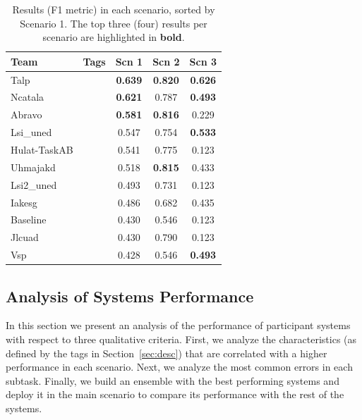 \documentclass[11pt,a4paper]{article}
\begin{document}
\begin{table}[tb]\centering
    \begin{tabular}{llccc}
        \toprule
        Team         & Tags  & Scn 1     & Scn 2     & Scn 3     \\
        \midrule
        Talp         &       & \bf 0.639 & \bf 0.820 & \bf 0.626 \\
        Ncatala      &       & \bf 0.621 &     0.787 & \bf 0.493 \\
        Abravo       &       & \bf 0.581 & \bf 0.816 &     0.229 \\
        Lsi\_uned    &       &     0.547 &     0.754 & \bf 0.533 \\
        Hulat-TaskAB &       &     0.541 &     0.775 &     0.123 \\
        Uhmajakd     &       &     0.518 & \bf 0.815 &     0.433 \\
        Lsi2\_uned   &       &     0.493 &     0.731 &     0.123 \\
        Iakesg       &       &     0.486 &     0.682 &     0.435 \\
        Baseline     &       &     0.430 &     0.546 &     0.123 \\
        Jlcuad       &       &     0.430 &     0.790 &     0.123 \\
        Vsp          &       &     0.428 &     0.546 & \bf 0.493 \\
        \bottomrule
    \end{tabular}
    \caption{Results (F1 metric) in each scenario, sorted by Scenario 1. The top three (four) results per scenario are highlighted in \textbf{bold}.}
\end{table}


\subsection{Analysis of Systems Performance}

In this section we present an analysis of the performance of participant systems with respect to three qualitative criteria. First, we analyze the characteristics (as defined by the tags in Section~\ref{sec:desc}) that are correlated with a higher performance in each scenario. Next, we analyze the most common errors in each subtask. Finally, we build an ensemble with the best performing systems and deploy it in the main scenario to compare its performance with the rest of the systems.
\end{document}
